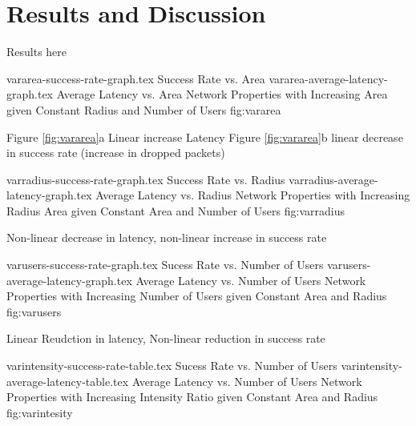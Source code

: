 \section{Results and Discussion}
Results here

\sidebysidefigures
{vararea-success-rate-graph.tex}       {Success Rate vs. Area}
{vararea-average-latency-graph.tex}    {Average Latency vs. Area}
{Network Properties with Increasing Area given Constant Radius and Number of Users}
{fig:vararea}

Figure \ref{fig:vararea}a Linear increase Latency
Figure \ref{fig:vararea}b linear decrease in success rate (increase in dropped packets)

\sidebysidefigures
{varradius-success-rate-graph.tex}     {Success Rate vs. Radius}
{varradius-average-latency-graph.tex}  {Average Latency vs. Radius}
{Network Properties with Increasing Radius Area given Constant Area and Number of Users}
{fig:varradius}

Non-linear decrease in latency, non-linear increase in success rate

\sidebysidefigures
{varusers-success-rate-graph.tex}      {Sucess Rate vs. Number of Users}
{varusers-average-latency-graph.tex}   {Average Latency vs. Number of Users}
{Network Properties with Increasing Number of Users given Constant Area and Radius}
{fig:varusers}

Linear Reudction in latency, Non-linear reduction in success rate

\sidebysidefigures
{varintensity-success-rate-table.tex}      {Sucess Rate vs. Number of Users}
{varintensity-average-latency-table.tex}   {Average Latency vs. Number of Users}
{Network Properties with Increasing Intensity Ratio given Constant Area and Radius}
{fig:varintesity}
